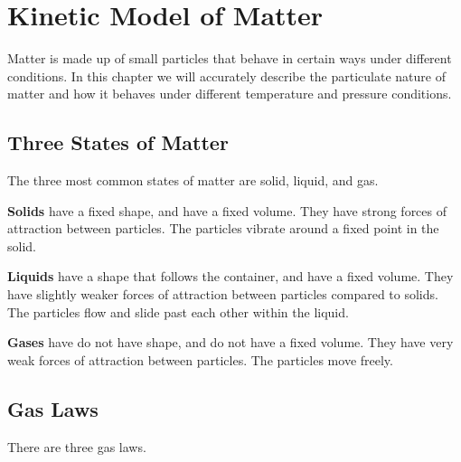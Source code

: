 \documentclass[../main.tex]{subfiles}
\begin{document}
	\section{Kinetic Model of Matter}
	
	\begin{preamb}
		Matter is made up of small particles that behave in certain ways under different conditions. In this chapter we will accurately describe the particulate nature of matter and how it behaves under different temperature and pressure conditions.
	\end{preamb}
	
	\subsection{Three States of Matter}
	The three most common states of matter are solid, liquid, and gas. 
	
	\textbf{Solids} have a fixed shape, and have a fixed volume. They have strong forces of attraction between particles. The particles vibrate around a fixed point in the solid.
	
	\textbf{Liquids} have a shape that follows the container, and have a fixed volume. They have slightly weaker forces of attraction between particles compared to solids. The particles flow and slide past each other within the liquid.
	
	\textbf{Gases} have do not have shape, and do not have a fixed volume. They have very weak forces of attraction between particles. The particles move freely.
	
	
	\subsection{Gas Laws}
	There are three gas laws. 
	
	
	
\end{document}
